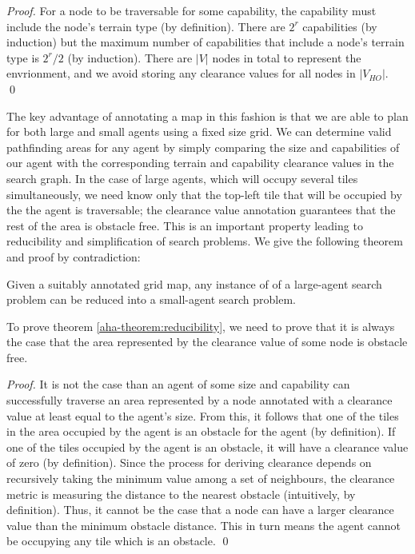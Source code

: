 \begin{proof}
For a node to be traversable for some capability, the capability must include the node's terrain type (by definition). 
There are $2^r$ capabilities (by induction) but the maximum number of capabilities that include a node's terrain type is $2^r/2$ (by induction). There are $|V|$ nodes in total to represent the envrionment, and we avoid storing any clearance values for all nodes in $|V_{HO}|$. 
\qed
\end{proof}

The key advantage of annotating a map in this fashion is that we are able to plan for both large and small agents using a fixed size grid. 
We can determine valid pathfinding areas for any agent by simply comparing the size and capabilities of our agent with the corresponding terrain and capability clearance values in the search graph. 
In the case of large agents, which will occupy several tiles simultaneously, we need know only that the top-left tile that will be occupied by the the agent is traversable; the clearance value annotation guarantees that the rest of the area is obstacle free. This is an important property leading to reducibility and simplification of search problems. We give the following theorem and proof by contradiction:

\begin{theorem}
\label{aha-theorem:reducibility}
Given a suitably annotated grid map, any instance of of a large-agent search problem can be reduced into a small-agent search problem.
\end{theorem}

To prove theorem \ref{aha-theorem:reducibility}, we need to prove that it is always the case that the area represented by the clearance value of some node is obstacle free. 
\begin{proof}
It is not the case than an agent of some size and capability can successfully traverse an area represented by a node annotated with a clearance value at least equal to the agent's size. From this, it follows that one of the tiles in the area occupied by the agent is an obstacle for the agent (by definition). If one of the tiles occupied by the agent is an obstacle, it will have a clearance value of zero (by definition). Since the process for deriving clearance depends on recursively taking the minimum value among a set of neighbours, the clearance metric is measuring the distance to the nearest obstacle (intuitively, by definition). Thus, it cannot be the case that a node can have a larger clearance value than the minimum obstacle distance. This in turn means the agent cannot be occupying any tile which is an obstacle. \qed
\end{proof}
